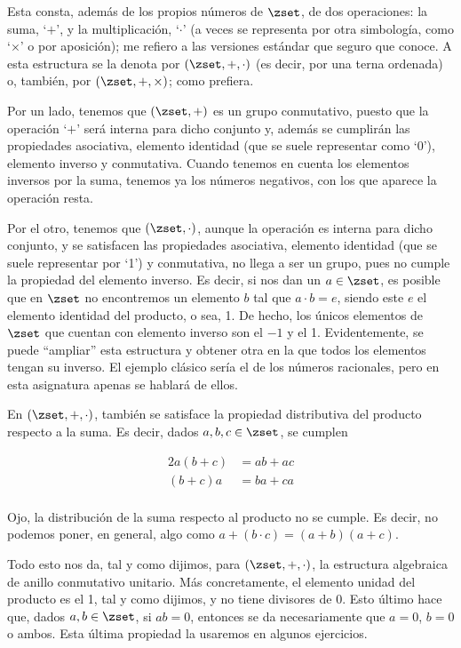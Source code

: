 

Esta consta, además de los propios números de $\zset$, de dos operaciones:
la suma, `$+$', y la multiplicación, `$\cdot$' (a veces se representa por
otra simbología, como `$\times$' o por aposición); me refiero a las
versiones estándar que seguro que conoce\footnotemark. A esta estructura se
la denota por $(\zset, +, \cdot)$ (es decir, por una terna ordenada) o,
también, por $(\zset, +, \times)$; como prefiera.


Por un lado, tenemos que $(\zset, +)$ es un grupo conmutativo, puesto que la
operación `$+$' será interna para dicho conjunto y, además se cumplirán las
propiedades asociativa, elemento identidad (que se suele representar como
`0'), elemento inverso y conmutativa. Cuando tenemos en cuenta los elementos
inversos por la suma, tenemos ya los números negativos, con los que aparece
la operación resta.

Por el otro, tenemos que $(\zset, \cdot)$, aunque la operación es interna
para dicho conjunto, y se satisfacen las propiedades asociativa, elemento
identidad (que se suele representar por `1') y conmutativa, no llega a ser
un grupo, pues no cumple la propiedad del elemento inverso. Es decir, si nos
dan un $a \in \zset$, es posible que en $\zset$ no encontremos un elemento
$b$ tal que $a \cdot b = e$, siendo este $e$ el elemento identidad del
producto, o sea, 1. De hecho, los únicos elementos de $\zset$ que cuentan
con elemento inverso son el ${-1}$ y el 1. Evidentemente, se puede
``ampliar'' esta estructura y obtener otra en la que todos los elementos
tengan su inverso. El ejemplo clásico sería el de los números racionales,
pero en esta asignatura apenas se hablará de ellos.

En $(\zset, +, \cdot)$, también se satisface la propiedad distributiva del
producto respecto a la suma. Es decir, dados $a, b, c \in \zset$, se cumplen

\begin{alignat*}{2}
  a(b + c) &= ab + ac \\
  (b + c)a &= ba + ca \\
\end{alignat*}

\noindent Ojo, la distribución de la suma respecto al producto no se cumple.
Es decir, no podemos poner, en general, algo como $a + (b \cdot c) =
(a+b)(a+c)$.

Todo esto nos da, tal y como dijimos, para $(\zset, +, \cdot)$, la
estructura algebraica de anillo conmutativo unitario. Más concretamente, el
elemento unidad del producto es el 1, tal y como dijimos, y no tiene
divisores de 0. Esto último hace que, dados $a, b \in \zset$, si $ab = 0$,
entonces se da necesariamente que $a = 0$, $b = 0$ o ambos. Esta última
propiedad la usaremos en algunos ejercicios.






